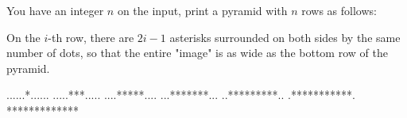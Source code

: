 




You have an integer $n$ on the input, print a pyramid with $n$ rows as follows:

On the $i$-th row, there are $2i-1$ asterisks surrounded on both sides by the same number of dots, so that the entire "image" is as wide as the bottom row of the pyramid.

\vystup
......*......
.....***.....
....*****....
...*******...
..*********..
.***********.
*************
\koniec

